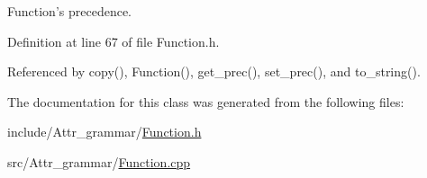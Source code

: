 Function's precedence. 



Definition at line 67 of file Function.h.

Referenced by copy(), Function(), get\_\-prec(), set\_\-prec(), and to\_\-string().

The documentation for this class was generated from the following files:\begin{CompactItemize}
\item 
include/Attr\_\-grammar/\hyperlink{Function_8h}{Function.h}\item 
src/Attr\_\-grammar/\hyperlink{Function_8cpp}{Function.cpp}\end{CompactItemize}
